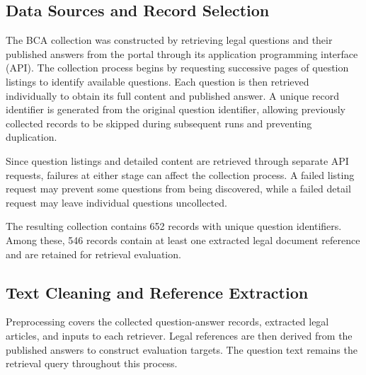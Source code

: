 \subsection{Data Sources and Record Selection}

The BCA collection was constructed by retrieving legal questions and their published answers from the portal through its application programming interface (API). The collection process begins by requesting successive pages of question listings to identify available questions. Each question is then retrieved individually to obtain its full content and published answer. A unique record identifier is generated from the original question identifier, allowing previously collected records to be skipped during subsequent runs and preventing duplication.

Since question listings and detailed content are retrieved through separate API requests, failures at either stage can affect the collection process. A failed listing request may prevent some questions from being discovered, while a failed detail request may leave individual questions uncollected.

The resulting collection contains 652 records with unique question identifiers. Among these, 546 records contain at least one extracted legal document reference and are retained for retrieval evaluation.

\subsection{Text Cleaning and Reference Extraction}

Preprocessing covers the collected question-answer records, extracted legal articles, and inputs to each retriever. Legal references are then derived from the published answers to construct evaluation targets. The question text remains the retrieval query throughout this process.


